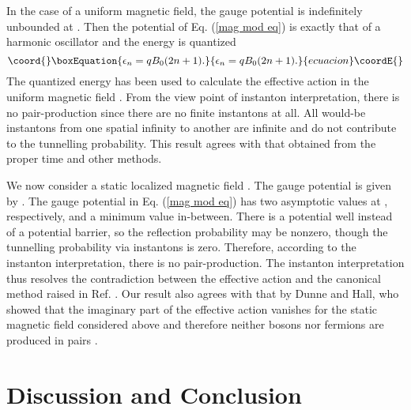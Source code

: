 \documentclass[a4paper,prd,showpacs,preprintnumbers,amsmath,amssymb]{revtex4}
\begin{document}
In the case of a uniform magnetic field, the gauge potential \coordHE{} is indefinitely unbounded at \coordHE{}. Then the potential of Eq. (\ref{mag mod eq}) is exactly
that of a harmonic oscillator and the energy is quantized
\begin{equation}\coord{}\boxEquation{
\epsilon_n = q B_0 (2n+1).
}{
\epsilon_n = q B_0 (2n+1).
}{ecuacion}\coordE{}\end{equation}
The quantized energy has been used to calculate the effective
action in the uniform magnetic field \cite{hei}. From the view
point of instanton interpretation, there is no pair-production
since there are no finite instantons at all. All would-be
instantons from one spatial infinity to another are infinite and
do not contribute to the tunnelling probability. This result
agrees with that obtained from the proper time and other methods.



We now consider a static localized magnetic field \coordHE{}. The gauge potential is
given by \coordHE{}. The gauge potential in
Eq. (\ref{mag mod eq}) has two asymptotic values \coordHE{} at \coordHE{}, respectively, and a minimum value
in-between. There is a potential well instead of a potential
barrier, so the reflection probability may be nonzero, though the
tunnelling probability via instantons is zero. Therefore,
according to the instanton interpretation, there is no
pair-production. The instanton interpretation thus resolves the
contradiction between the effective action and the canonical
method raised in Ref. \cite{sri}. Our result also agrees with that
by Dunne and Hall, who showed that the imaginary part of the
effective action vanishes for the static magnetic field considered
above and therefore neither bosons nor fermions are produced in
pairs \cite{dun2,dun3}.









\section{Discussion and Conclusion}
\end{document}
